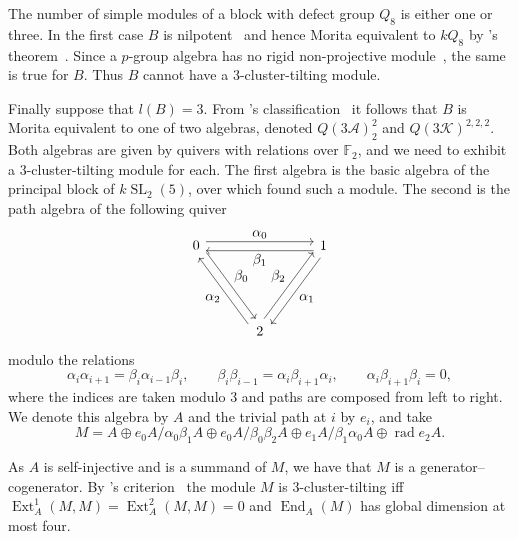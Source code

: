 \documentclass[11pt,a4paper,reqno]{amsart}
\newcommand{\kk}{k}
\theoremstyle{definition}
\DeclareMathOperator{\End}{End}
\DeclareMathOperator{\Ext}{Ext}
\DeclareMathOperator{\rad}{rad}
\begin{document}
The number of simple modules of a block with defect group $Q_{8}$ is
either one or three.  In the first case $B$ is
nilpotent~\cite[Proposition 3.1]{EEKLS} and hence Morita equivalent to
$\kk Q_{8}$ by \citeauthor{Puig}'s theorem~\cite{Puig}.  Since a
$p$-group algebra has no rigid non-projective module~\cite[Proposition
  2.9]{EKM}, the same is true for $B$.  Thus $B$ cannot have a
$3$-cluster-tilting module.

Finally suppose that $l(B)=3$.  From \citeauthor{Erdmann}'s
classification~\cite[Section IX.5]{Erdmann} it follows that $B$ is
Morita equivalent to one of two algebras, denoted
$Q(3\mathcal A)_{2}^{2}$ and $Q(3\mathcal K)^{2,2,2}$.  Both algebras
are given by quivers with relations over $\mathbb F_{2}$, and we need
to exhibit a $3$-cluster-tilting module for each.  The first algebra
is the basic algebra of the principal block of
$\kk\operatorname{SL}_{2}(5)$, over which \citet[Theorem 1.3]{BM}
found such a module.  The second is the path algebra of the following
quiver
%
\begin{equation*}
  \begin{tikzcd}[column sep=3.2em,row sep=4.8em,
      every arrow/.append style={shift left=0.75ex},
      every label/.append style={font=\normalsize}]
    0 \arrow[rr,"\alpha_{0}"] \arrow[dr,"\beta_{0}"]
    & & 1 \arrow[ll,"\beta_{1}"] \arrow[dl,"\alpha_{1}"] \\
    & 2 \arrow[ul,"\alpha_{2}"] \arrow[ur,"\beta_{2}"] &
  \end{tikzcd}
\end{equation*}
%
modulo the relations
%
\begin{equation*}
  \alpha_{i}\alpha_{i+1}=\beta_{i}\alpha_{i-1}\beta_{i},\qquad
  \beta_{i}\beta_{i-1}=\alpha_{i}\beta_{i+1}\alpha_{i},\qquad
  \alpha_{i}\beta_{i+1}\beta_{i}=0,
\end{equation*}
%
where the indices are taken modulo $3$ and paths are composed from
left to right.  We denote this algebra by $A$ and the trivial path at
$i$ by $e_{i}$, and take
%
\begin{equation*}
  M=A\oplus e_{0}A/\alpha_{0}\beta_{1}A\oplus
  e_{0}A/\beta_{0}\beta_{2}A\oplus e_{1}A/\beta_{1}\alpha_{0}A\oplus
  \rad e_{2}A.
\end{equation*}

As $A$ is self-injective and is a summand of $M$, we have that $M$ is
a generator--cogenerator.  By \citeauthor{IyamaAC}'s
criterion~\cite[Theorem 5.1(3)]{IyamaAC} the module $M$ is
$3$-cluster-tilting iff $\Ext_{A}^{1}(M,M)=\Ext_{A}^{2}(M,M)=0$ and
$\End_{A}(M)$ has global dimension at most four.
\end{document}
